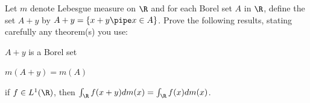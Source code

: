 Let $m$ denote Lebesgue measure on $\R$ and for each Borel set $A$ in
$\R$, define the set $A+y$ by $A+y=\{x+y\pipe x\in A\}$.  Prove the
following results, stating carefully any theorem(s) you use:
\begin{alist}
\item $A+y$ is a Borel set
\item $m(A+y)=m(A)$
\item if $f\in L^1(\R)$, then
$\int_{\R}f(x+y)dm(x)=\int_{\R}f(x)dm(x)$.
\end{alist}
